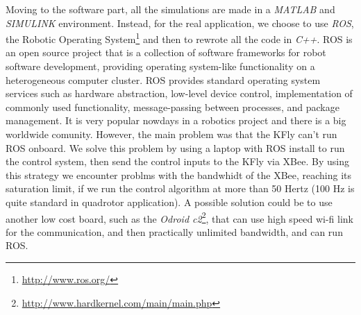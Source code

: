 \noindent Moving to the software part, all the simulations are made in a \textit{MATLAB} and \textit{SIMULINK} environment. Instead, for the real application, we choose to use \textit{ROS}, the Robotic Operating System\footnote{\url{http://www.ros.org/}} and then to rewrote all the code in \textit{C++}. ROS is an open source project that is a collection of software frameworks for robot software development, providing operating system-like functionality on a heterogeneous computer cluster. ROS provides standard operating system services such as hardware abstraction, low-level device control, implementation of commonly used functionality, message-passing between processes, and package management. It is very popular nowdays in a robotics project and there is a big worldwide comunity. However, the main problem was that the KFly can't run ROS onboard. We solve this problem by using a laptop with ROS install to run the control system, then send the control inputs to the KFly via XBee. By using this strategy we encounter problms with the bandwhidt of the XBee, reaching its saturation limit, if we run the control algorithm at more than 50 Hertz (100 Hz is quite standard in quadrotor application). A possible solution could be to use another low cost board, such as the \textit{Odroid c2}\footnote{\url{http://www.hardkernel.com/main/main.php}}, that can use high speed wi-fi link for the communication, and then practically unlimited bandwidth, and can run ROS. 